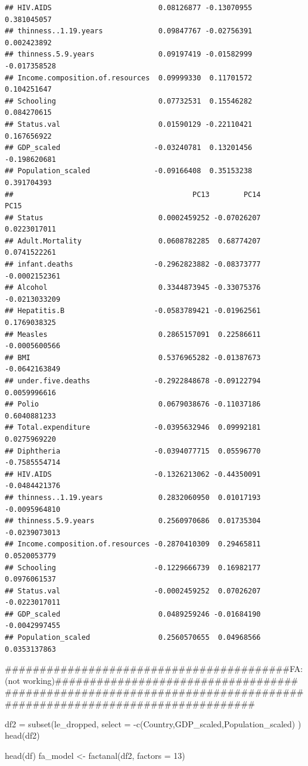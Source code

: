 \documentclass[
]{article}
\begin{document}
\begin{verbatim}
## HIV.AIDS                         0.08126877 -0.13070955  0.381045057
## thinness..1.19.years             0.09847767 -0.02756391  0.002423892
## thinness.5.9.years               0.09197419 -0.01582999 -0.017358528
## Income.composition.of.resources  0.09999330  0.11701572  0.104251647
## Schooling                        0.07732531  0.15546282  0.084270615
## Status.val                       0.01590129 -0.22110421  0.167656922
## GDP_scaled                      -0.03240781  0.13201456 -0.198620681
## Population_scaled               -0.09166408  0.35153238  0.391704393
##                                          PC13        PC14          PC15
## Status                           0.0002459252 -0.07026207  0.0223017011
## Adult.Mortality                  0.0608782285  0.68774207  0.0741522261
## infant.deaths                   -0.2962823882 -0.08373777 -0.0002152361
## Alcohol                          0.3344873945 -0.33075376 -0.0213033209
## Hepatitis.B                     -0.0583789421 -0.01962561  0.1769038325
## Measles                          0.2865157091  0.22586611 -0.0005600566
## BMI                              0.5376965282 -0.01387673 -0.0642163849
## under.five.deaths               -0.2922848678 -0.09122794  0.0059996616
## Polio                            0.0679038676 -0.11037186  0.6040881233
## Total.expenditure               -0.0395632946  0.09992181  0.0275969220
## Diphtheria                      -0.0394077715  0.05596770 -0.7585554714
## HIV.AIDS                        -0.1326213062 -0.44350091 -0.0484421376
## thinness..1.19.years             0.2832060950  0.01017193 -0.0095964810
## thinness.5.9.years               0.2560970686  0.01735304 -0.0239073013
## Income.composition.of.resources -0.2870410309  0.29465811  0.0520053779
## Schooling                       -0.1229666739  0.16982177  0.0976061537
## Status.val                      -0.0002459252  0.07026207 -0.0223017011
## GDP_scaled                       0.0489259246 -0.01684190 -0.0042997455
## Population_scaled                0.2560570655  0.04968566  0.0353137863
\end{verbatim}

\#\#\#\#\#\#\#\#\#\#\#\#\#\#\#\#\#\#\#\#\#\#\#\#\#\#\#\#\#\#\#\#\#\#\#\#\#\#\#\#\#FA:(not
working)\#\#\#\#\#\#\#\#\#\#\#\#\#\#\#\#\#\#\#\#\#\#\#\#\#\#\#\#\#\#\#\#\#\#\#
\#\#\#\#\#\#\#\#\#\#\#\#\#\#\#\#\#\#\#\#\#\#\#\#\#\#\#\#\#\#\#\#\#\#\#\#\#\#\#\#\#\#\#\#\#\#\#\#\#\#\#\#\#\#\#\#\#\#\#\#\#\#\#\#\#\#\#\#\#\#\#\#\#\#\#\#\#\#\#

df2 = subset(le\_dropped, select =
-c(Country,GDP\_scaled,Population\_scaled) ) head(df2)

head(df) fa\_model \textless- factanal(df2, factors = 13)
\end{document}
